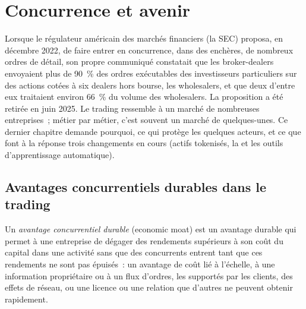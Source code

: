 \chapter{Concurrence et avenir}\label{ch:fm:competition-and-the-future}

Lorsque le régulateur américain des marchés financiers (la SEC) proposa, en décembre 2022, de faire entrer en concurrence, dans des enchères, de nombreux ordres de détail, son propre communiqué constatait que les broker-dealers
envoyaient plus de 90~\% des ordres exécutables des investisseurs particuliers sur des actions cotées à six dealers hors bourse, les wholesalers, et que deux d'entre eux
traitaient environ 66~\% du volume des wholesalers. La proposition a été retirée en juin 2025. Le trading ressemble à un marché de nombreuses entreprises~; métier par métier, c'est souvent un marché de quelques-unes.
Ce dernier chapitre demande pourquoi, ce qui protège les quelques acteurs, et ce que font à la réponse trois changements en cours (actifs tokenisés,
la  et les outils d'apprentissage automatique).

\section{Avantages concurrentiels durables dans le trading}

\begin{definition}\label{def:fm:competition-and-the-future:moat}
Un \emph{avantage concurrentiel durable} (economic moat) est un avantage durable qui permet à une entreprise de dégager des rendements supérieurs à son coût du capital dans une activité sans
que des concurrents entrent tant que ces rendements ne sont pas épuisés~: un avantage de coût lié à l'échelle, à une information propriétaire ou à un flux d'ordres, les  supportés par les clients,
des effets de réseau, ou une licence ou une relation que d'autres ne peuvent obtenir rapidement.
\end{definition}

